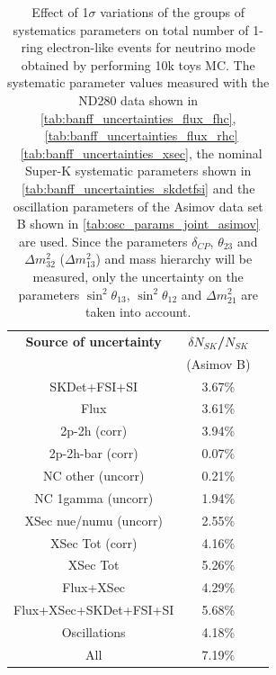 

\begin{table}[htb]
\centering
\begin{tabular}{| c | c | c |}
\hline
  {\bf Source of uncertainty}    & \multicolumn{1}{c|}{{\bf ${\delta}N_{SK}$/$N_{SK}$}}\\
                                 & \multicolumn{1}{c|}{(Asimov B)}\\

\hline
\hline  SKDet+FSI+SI                   & 3.67\%                        \\
\hline
  Flux                           & 3.61\%                        \\
\hline
\hline
  2p-2h (corr)                     & 3.94\%                        \\
  2p-2h-bar (corr)                  & 0.07\%                        \\
  NC other (uncorr)              & 0.21\%                        \\
  NC 1gamma (uncorr)             & 1.94\%                        \\
  XSec nue/numu (uncorr)                 & 2.55\%                        \\
\hline
  XSec Tot (corr)                  & 4.16\%                        \\
  XSec Tot                       & 5.26\%                        \\
\hline
\hline
  Flux+XSec                      & 4.29\%                        \\
\hline
\hline
  Flux+XSec+SKDet+FSI+SI         & 5.68\%                        \\
\hline
\hline
  Oscillations                   & 4.18\%                        \\
\hline
\hline
  All                            & 7.19\%                        \\
\hline
\hline

\end{tabular}
\caption{
 Effect of 1$\sigma$ variations of the groups of systematics parameters on total number of
 1-ring electron-like events for neutrino mode obtained by performing 10k toys MC.
The systematic parameter values measured with the ND280 data 
shown in 
\cref{tab:banff_uncertainties_flux_fhc},
~\ref{tab:banff_uncertainties_flux_rhc}
~\ref{tab:banff_uncertainties_xsec},
the nominal Super-K systematic parameters shown in \cref{tab:banff_uncertainties_skdetfsi}
and the oscillation parameters of the Asimov data set B shown in \cref{tab:osc_params_joint_asimov}
are used.
Since the parameters $\delta_{CP}$, $\theta_{23}$ and $\Delta m^2_{32}$ ($\Delta m^2_{13}$) and mass hierarchy
will be measured,
only the uncertainty on the parameters 
$\sin^2 \theta_{13}$,
$\sin^2 \theta_{12}$
and 
$\Delta m^2_{21}$ 
are taken into account.
}                                                                                                                                                                                          
\label{tab:nsk_systematic_table_summary_joint_asimov_B_fhc_elike}
\end{table}



